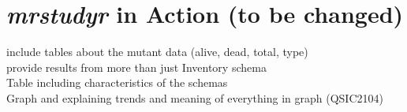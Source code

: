 \vspace*{-0.25cm}
\section{\textit{mrstudyr} in Action (to be changed)}

include tables about the mutant data (alive, dead, total, type) \\
provide results from more than just Inventory schema \\
Table including characteristics of the schemas \\
Graph and explaining trends and meaning of everything in graph (QSIC2104)

%
%
%
